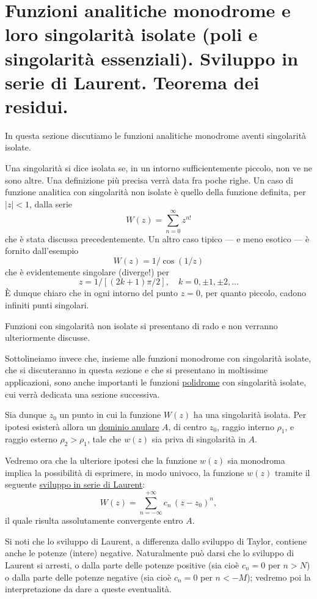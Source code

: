 \documentclass[11pt, a4paper]{book}
\numberwithin{equation}{section}
\begin{document}
\section{Funzioni analitiche monodrome e loro singolarità isolate (poli e singolarità essenziali). Sviluppo in serie di Laurent. Teorema dei residui.}

In questa sezione discutiamo le funzioni analitiche monodrome aventi singolarità isolate.

Una singolarità si dice isolata se, in un intorno sufficientemente piccolo, non ve ne sono altre. Una definizione più precisa verrà data fra poche righe. Un caso di funzione analitica con singolarità non isolate è quello della funzione definita, per $|z| < 1$, dalla serie
\[
W(z) = \sum_{n=0}^{\infty} z^{n!}
\]
che è stata discussa precedentemente. Un altro caso tipico — e meno esotico — è fornito dall'esempio
\[
W(z) = 1/\cos(1/z)
\]
che è evidentemente singolare (diverge!) per
\[
z = 1\big/\!\left[(2k+1)\pi/2\right], \quad k = 0, \pm 1, \pm 2, \ldots
\]
È dunque chiaro che in ogni intorno del punto $z = 0$, per quanto piccolo, cadono infiniti punti singolari.

Funzioni con singolarità non isolate si presentano di rado e non verranno ulteriormente discusse.

Sottolineiamo invece che, insieme alle funzioni monodrome con singolarità isolate, che si discuteranno in questa sezione e che si presentano in moltissime applicazioni, sono anche importanti le funzioni \uline{polidrome} con singolarità isolate, cui verrà dedicata una sezione successiva.

Sia dunque $z_0$ un punto in cui la funzione $W(z)$ ha una singolarità isolata. Per ipotesi esisterà allora un \uline{dominio anulare} $A$, di centro $z_0$, raggio interno $\rho_1$, e raggio esterno $\rho_2 > \rho_1$, tale che $w(z)$ sia priva di singolarità in $A$.

Vedremo ora che la ulteriore ipotesi che la funzione $w(z)$ sia monodroma implica la possibilità di esprimere, in modo univoco, la funzione $w(z)$ tramite il seguente \uline{sviluppo in serie di Laurent}:
\begin{equation}
W(z) = \sum_{n=-\infty}^{+\infty} c_n\,(z - z_0)^n, \tag{1}
\end{equation}
il quale risulta assolutamente convergente entro $A$.

Si noti che lo sviluppo di Laurent, a differenza dallo sviluppo di Taylor, contiene anche le potenze (intere) negative. Naturalmente può darsi che lo sviluppo di Laurent si arresti, o dalla parte delle potenze positive (sia cioè $c_n = 0$ per $n > N$) o dalla parte delle potenze negative (sia cioè $c_n = 0$ per $n < -M$); vedremo poi la interpretazione da dare a queste eventualità.
\end{document}

